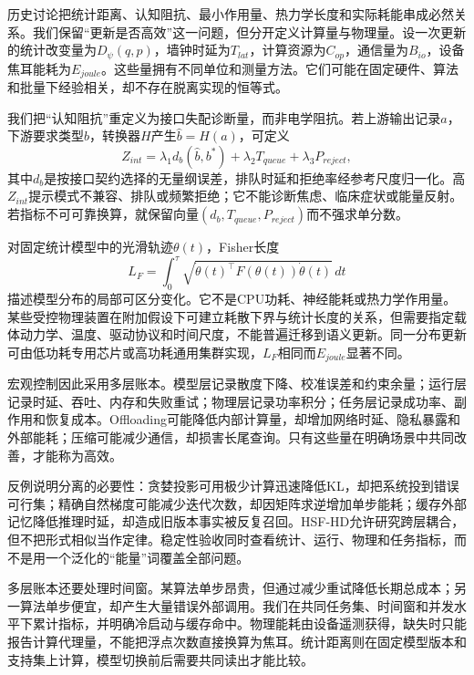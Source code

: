 历史讨论把统计距离、认知阻抗、最小作用量、热力学长度和实际耗能串成必然关系。我们保留“更新是否高效”这一问题，但分开定义计算量与物理量。设一次更新的统计改变量为$D_\psi(q,p)$，墙钟时延为$T_{lat}$，计算资源为$C_{op}$，通信量为$B_{io}$，设备焦耳能耗为$E_{joule}$。这些量拥有不同单位和测量方法。它们可能在固定硬件、算法和批量下经验相关，却不存在脱离实现的恒等式。

我们把“认知阻抗”重定义为接口失配诊断量，而非电学阻抗。若上游输出记录$a$，下游要求类型$b$，转换器$H$产生$\hat b=H(a)$，可定义
\begin{equation}
Z_{int}=\lambda_1d_b(\hat b,b^*)+\lambda_2T_{queue}+\lambda_3P_{reject},
\end{equation}
其中$d_b$是按接口契约选择的无量纲误差，排队时延和拒绝率经参考尺度归一化。高$Z_{int}$提示模式不兼容、排队或频繁拒绝；它不能诊断焦虑、临床症状或能量反射。若指标不可可靠换算，就保留向量$(d_b,T_{queue},P_{reject})$而不强求单分数。

对固定统计模型中的光滑轨迹$\theta(t)$，Fisher长度
\begin{equation}
L_F=\int_0^\tau\sqrt{\dot\theta(t)^\top F(\theta(t))\dot\theta(t)}\,dt
\end{equation}
描述模型分布的局部可区分变化。它不是CPU功耗、神经能耗或热力学作用量。某些受控物理装置在附加假设下可建立耗散下界与统计长度的关系，但需要指定载体动力学、温度、驱动协议和时间尺度，不能普遍迁移到语义更新。同一分布更新可由低功耗专用芯片或高功耗通用集群实现，$L_F$相同而$E_{joule}$显著不同。

宏观控制因此采用多层账本。模型层记录散度下降、校准误差和约束余量；运行层记录时延、吞吐、内存和失败重试；物理层记录功率积分；任务层记录成功率、副作用和恢复成本。Offloading可能降低内部计算量，却增加网络时延、隐私暴露和外部能耗；压缩可能减少通信，却损害长尾查询。只有这些量在明确场景中共同改善，才能称为高效。

反例说明分离的必要性：贪婪投影可用极少计算迅速降低KL，却把系统投到错误可行集；精确自然梯度可能减少迭代次数，却因矩阵求逆增加单步能耗；缓存外部记忆降低推理时延，却造成旧版本事实被反复召回。HSF-HD允许研究跨层耦合，但不把形式相似当作定律。稳定性验收同时查看统计、运行、物理和任务指标，而不是用一个泛化的“能量”词覆盖全部问题。

多层账本还要处理时间窗。某算法单步昂贵，但通过减少重试降低长期总成本；另一算法单步便宜，却产生大量错误外部调用。我们在共同任务集、时间窗和并发水平下累计指标，并明确冷启动与缓存命中。物理能耗由设备遥测获得，缺失时只能报告计算代理量，不能把浮点次数直接换算为焦耳。统计距离则在固定模型版本和支持集上计算，模型切换前后需要共同读出才能比较。

